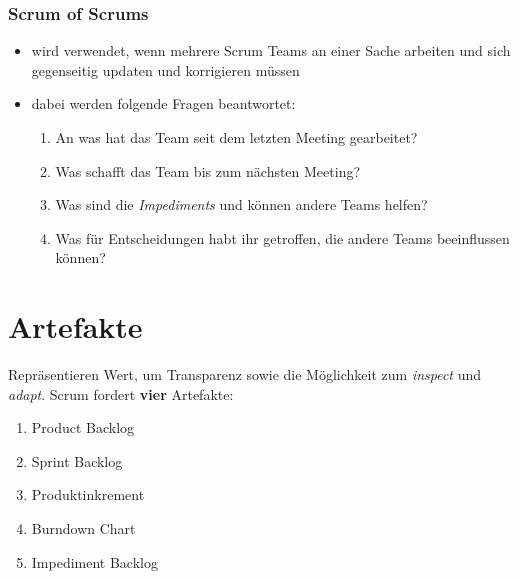 \subsubsection{Scrum of Scrums}
\begin{itemize}
  \item wird verwendet, wenn mehrere Scrum Teams an einer Sache arbeiten und sich gegenseitig
    updaten und korrigieren müssen
  \item dabei werden folgende Fragen beantwortet:
    \begin{enumerate}
      \item An was hat das Team seit dem letzten Meeting gearbeitet?
      \item Was schafft das Team bis zum nächsten Meeting?
      \item Was sind die \textit{Impediments} und können andere Teams helfen?
      \item Was für Entscheidungen habt ihr getroffen, die andere Teams beeinflussen können?
    \end{enumerate}
\end{itemize}
\pagebreak


\section{Artefakte}
Repräsentieren Wert, um Transparenz sowie die Möglichkeit zum \textit{inspect} und \textit{adapt}.
Scrum fordert \textbf{vier} Artefakte:

\begin{enumerate}
  \item Product Backlog
  \item Sprint Backlog
  \item Produktinkrement
  \item Burndown Chart
  \item Impediment Backlog
\end{enumerate}


